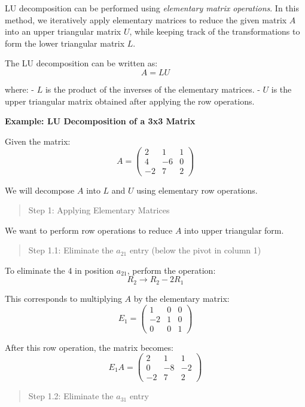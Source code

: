 \documentclass[
  letterpaper,
  DIV=11,
  numbers=noendperiod]{scrreprt}
\theoremstyle{plain}
\theoremstyle{definition}
\theoremstyle{remark}
\begin{document}
LU decomposition can be performed using \emph{elementary matrix
operations}. In this method, we iteratively apply elementary matrices to
reduce the given matrix \(A\) into an upper triangular matrix \(U\),
while keeping track of the transformations to form the lower triangular
matrix \(L\).

The LU decomposition can be written as: \[A = LU\]

where: - \(L\) is the product of the inverses of the elementary
matrices. - \(U\) is the upper triangular matrix obtained after applying
the row operations.

\textbf{Example: LU Decomposition of a 3x3 Matrix}

Given the matrix: \[
A = \begin{pmatrix} 
2 & 1 & 1 \\
4 & -6 & 0 \\
-2 & 7 & 2 
\end{pmatrix}
\]

We will decompose \(A\) into \(L\) and \(U\) using elementary row
operations.

\begin{quote}
Step 1: Applying Elementary Matrices
\end{quote}

We want to perform row operations to reduce \(A\) into upper triangular
form.

\begin{quote}
Step 1.1: Eliminate the \(a_{21}\) entry (below the pivot in column 1)
\end{quote}

To eliminate the \(4\) in position \(a_{21}\), perform the operation:
\[R_2 \rightarrow R_2 - 2R_1\]

This corresponds to multiplying \(A\) by the elementary matrix:
\[E_1 = \begin{pmatrix}1 & 0 & 0 \\-2 & 1 & 0 \\0 & 0 & 1\end{pmatrix}\]

After this row operation, the matrix becomes: \[
E_1 A = \begin{pmatrix} 
2 & 1 & 1 \\
0 & -8 & -2 \\
-2 & 7 & 2 
\end{pmatrix}
\]

\begin{quote}
Step 1.2: Eliminate the \(a_{31}\) entry
\end{quote}
\end{document}
